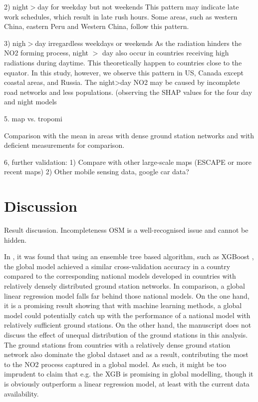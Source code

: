 \documentclass{article}
\begin{document}
2) night$>$day for weekday but not weekends
This pattern may indicate late work schedules, which result in late rush hours. 
Some areas, such as western China, eastern Peru and Western China, follow this pattern. 

3) nigh$>$day irregardless weekdays or weekends
As the radiation hinders the NO2 forming process, night $>$ day also occur in countries receiving high radiations during daytime. This theoretically happen to countries close to the equator. In this study, however, we observe this pattern in US, Canada except coastal areas, and Russia.  
The night>day NO2 may be caused by incomplete road networks and less populations. (observing the SHAP values for the four day and night models

5. map vs. tropomi 

Comparison with the mean in areas with dense ground station networks and with deficient measurements for comparison.



					
6, further validation: 
1)	Compare with other large-scale maps (ESCAPE or more recent maps)
2)	Other mobile sensing data, google car data? 


\section{Discussion}
Result discussion. 
Incompleteness OSM is a well-recognised issue and cannot be hidden. 


In \cite{LU2020105856}, it was found that using an ensemble tree based algorithm, such as XGBoost \citep{chen2016xgboost}, the global model achieved a similar cross-validation accuracy in a country compared to the corresponding national models developed in countries with relatively densely distributed ground station networks. In comparison, a global linear regression model falls far behind those national models. On the one hand, it is a promising result showing that with machine learning methods, a global model could potentially catch up with the performance of a national model with relatively sufficient ground stations. On the other hand, the manuscript does not discuss the effect of unequal distribution of the ground stations in this analysis. The ground stations from countries with a relatively dense ground station network also dominate the global dataset and as a result, contributing the most to the NO2 process captured in a global model. As such, it might be too imprudent to claim that e.g. the XGB is promising in global modelling, though it is obviously outperform a linear regression model, at least with the current data availability. 
\end{document}
